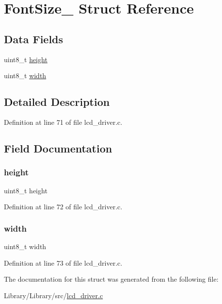 \hypertarget{struct_font_size__}{}\section{Font\+Size\+\_\+ Struct Reference}
\label{struct_font_size__}
\subsection*{Data Fields}
\begin{DoxyCompactItemize}
\item 
uint8\+\_\+t \mbox{\hyperlink{struct_font_size___adcf201a8aabf55cb352ec05331242594}{height}}
\item 
uint8\+\_\+t \mbox{\hyperlink{struct_font_size___a09a2a45f731b02946ff6d3cd15c1a476}{width}}
\end{DoxyCompactItemize}


\subsection{Detailed Description}


Definition at line 71 of file lcd\+\_\+driver.\+c.



\subsection{Field Documentation}
\mbox{\label{struct_font_size___adcf201a8aabf55cb352ec05331242594}} 
\subsubsection{\texorpdfstring{height}{height}}
{\footnotesize\ttfamily uint8\+\_\+t height}



Definition at line 72 of file lcd\+\_\+driver.\+c.

\mbox{\label{struct_font_size___a09a2a45f731b02946ff6d3cd15c1a476}} 
\subsubsection{\texorpdfstring{width}{width}}
{\footnotesize\ttfamily uint8\+\_\+t width}



Definition at line 73 of file lcd\+\_\+driver.\+c.



The documentation for this struct was generated from the following file\+:\begin{DoxyCompactItemize}
\item 
Library/\+Library/src/\mbox{\hyperlink{lcd__driver_8c}{lcd\+\_\+driver.\+c}}\end{DoxyCompactItemize}

